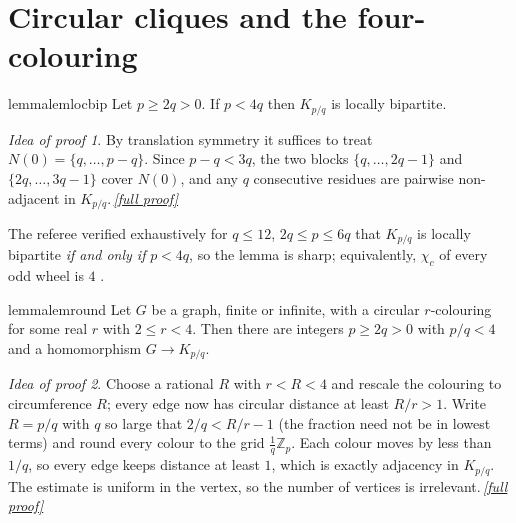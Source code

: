 \documentclass[11pt,a4paper]{article}
\theoremstyle{plain}
\theoremstyle{definition}
\theoremstyle{remark}
\newtheorem*{proofidea}{Idea of proof}
\newcommand{\fullproofref}[1]{\,\hyperref[#1]{\textit{[full proof]}}}
\newcommand{\Z}{\mathbb Z}
\newcommand{\chic}{\chi_c}
\newcommand{\Kc}[2]{K_{#1/#2}}
\begin{document}
\section{Circular cliques and the four-colouring}

\begin{restatable}{lemma}{lemlocbip}\label{lem:locbip}
Let $p\ge2q>0$. If $p<4q$ then $\Kc pq$ is locally bipartite.
\end{restatable}
\begin{proofidea}
By translation symmetry it suffices to treat $N(0)=\{q,\dots,p-q\}$. Since $p-q<3q$, the two blocks $\{q,\dots,2q-1\}$ and $\{2q,\dots,3q-1\}$ cover $N(0)$, and any $q$ consecutive residues are pairwise non-adjacent in $\Kc pq$.\fullproofref{pf:locbip}
\end{proofidea}
The referee verified exhaustively for $q\le12$, $2q\le p\le6q$ that $\Kc pq$ is locally bipartite \emph{if and only if} $p<4q$, so the lemma is sharp; equivalently, $\chic$ of every odd wheel is $4$ \cite{Zhu01}.

\begin{restatable}{lemma}{lemround}\label{lem:round}
Let $G$ be a graph, finite or infinite, with a circular $r$-colouring for some real $r$ with $2\le r<4$. Then there are integers $p\ge2q>0$ with $p/q<4$ and a homomorphism $G\to\Kc pq$.
\end{restatable}
\begin{proofidea}
Choose a rational $R$ with $r<R<4$ and rescale the colouring to circumference $R$; every edge now has circular distance at least $R/r>1$. Write $R=p/q$ with $q$ so large that $2/q<R/r-1$ (the fraction need not be in lowest terms) and round every colour to the grid $\tfrac1q\Z_p$. Each colour moves by less than $1/q$, so every edge keeps distance at least $1$, which is exactly adjacency in $\Kc pq$. The estimate is uniform in the vertex, so the number of vertices is irrelevant.\fullproofref{pf:round}
\end{proofidea}
\end{document}
